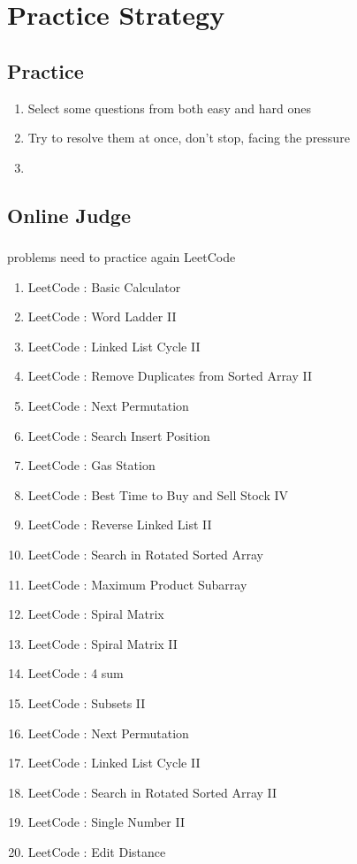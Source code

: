 \chapter{Practice Strategy}

\section{Practice }
\begin{enumerate}
    \item Select some questions from both easy and hard ones
    \item Try to resolve them at once, don't stop, facing the pressure
    \item
\end{enumerate}

\section{Online Judge }

\subsection{}

problems need to practice again
LeetCode
\begin{enumerate}
    \item LeetCode : Basic Calculator
    \item LeetCode : Word Ladder II
    \item LeetCode : Linked List Cycle II
    \item LeetCode : Remove Duplicates from Sorted Array II
    \item LeetCode : Next Permutation
    \item LeetCode : Search Insert Position
    \item LeetCode : Gas Station
    \item LeetCode : Best Time to Buy and Sell Stock IV
    \item LeetCode : Reverse Linked List II
    \item LeetCode : Search in Rotated Sorted Array
    \item LeetCode : Maximum Product Subarray
    \item LeetCode : Spiral Matrix
    \item LeetCode : Spiral Matrix II
    \item LeetCode : 4 sum
    \item LeetCode : Subsets II
    \item LeetCode : Next Permutation
    \item LeetCode : Linked List Cycle II
    \item LeetCode : Search in Rotated Sorted Array II
    \item LeetCode : Single Number II
    \item LeetCode : Edit Distance
\end{enumerate}



